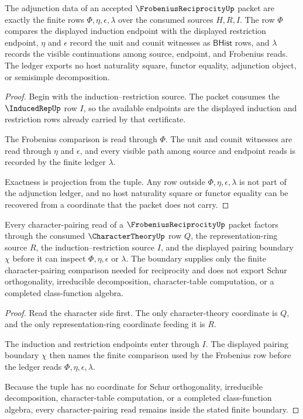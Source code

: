 \begin{theorem}\label{thm:frobenius-reciprocity-adjunction-ledger}
The adjunction data of an accepted $\FrobeniusReciprocityUp$ packet are exactly the finite rows $\Phi,\eta,\epsilon,\lambda$ over the consumed sources $H,R,I$. The row $\Phi$ compares the displayed induction endpoint with the displayed restriction endpoint, $\eta$ and $\epsilon$ record the unit and counit witnesses as $\mathsf{BHist}$ rows, and $\lambda$ records the visible continuations among source, endpoint, and Frobenius reads. The ledger exports no host naturality square, functor equality, adjunction object, or semisimple decomposition.
\end{theorem}
\begin{proof}
Begin with the induction--restriction source. The packet consumes the $\InducedRepUp$ row $I$, so the available endpoints are the displayed induction and restriction rows already carried by that certificate.

The Frobenius comparison is read through $\Phi$. The unit and counit witnesses are read through $\eta$ and $\epsilon$, and every visible path among source and endpoint reads is recorded by the finite ledger $\lambda$.

Exactness is projection from the tuple. Any row outside $\Phi,\eta,\epsilon,\lambda$ is not part of the adjunction ledger, and no host naturality square or functor equality can be recovered from a coordinate that the packet does not carry.
\end{proof}

\begin{theorem}\label{thm:frobenius-reciprocity-character-pairing-boundary}
Every character-pairing read of a $\FrobeniusReciprocityUp$ packet factors through the consumed $\CharacterTheoryUp$ row $Q$, the representation-ring source $R$, the induction--restriction source $I$, and the displayed pairing boundary $\chi$ before it can inspect $\Phi,\eta,\epsilon$ or $\lambda$. The boundary supplies only the finite character-pairing comparison needed for reciprocity and does not export Schur orthogonality, irreducible decomposition, character-table computation, or a completed class-function algebra.
\end{theorem}
\begin{proof}
Read the character side first. The only character-theory coordinate is $Q$, and the only representation-ring coordinate feeding it is $R$.

The induction and restriction endpoints enter through $I$. The displayed pairing boundary $\chi$ then names the finite comparison used by the Frobenius row before the ledger reads $\Phi,\eta,\epsilon,\lambda$.

Because the tuple has no coordinate for Schur orthogonality, irreducible decomposition, character-table computation, or a completed class-function algebra, every character-pairing read remains inside the stated finite boundary.
\end{proof}

